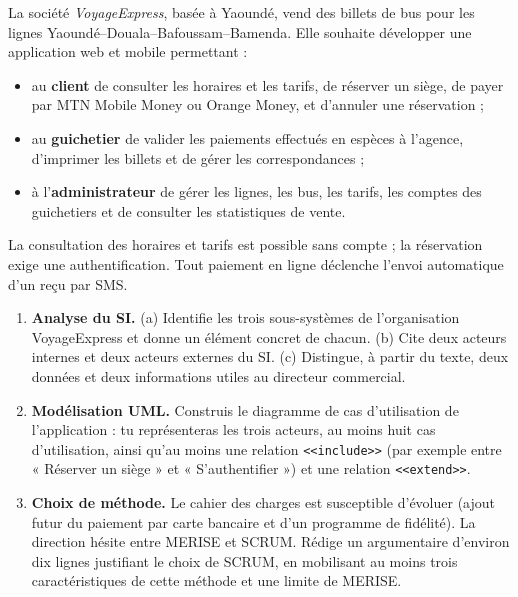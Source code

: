 \documentclass[11pt]{article}
\begin{document}
\begin{exercice}
La société \emph{VoyageExpress}, basée à Yaoundé, vend des billets de bus pour les lignes Yaoundé--Douala--Bafoussam--Bamenda. Elle souhaite développer une application web et mobile permettant :
\begin{itemize}
    \item au \textbf{client} de consulter les horaires et les tarifs, de réserver un siège, de payer par MTN Mobile Money ou Orange Money, et d'annuler une réservation ;
    \item au \textbf{guichetier} de valider les paiements effectués en espèces à l'agence, d'imprimer les billets et de gérer les correspondances ;
    \item à l'\textbf{administrateur} de gérer les lignes, les bus, les tarifs, les comptes des guichetiers et de consulter les statistiques de vente.
\end{itemize}
La consultation des horaires et tarifs est possible sans compte ; la réservation exige une authentification. Tout paiement en ligne déclenche l'envoi automatique d'un reçu par SMS.

\begin{enumerate}
    \item \textbf{Analyse du SI.} (a) Identifie les trois sous-systèmes de l'organisation VoyageExpress et donne un élément concret de chacun. (b) Cite deux acteurs internes et deux acteurs externes du SI. (c) Distingue, à partir du texte, deux données et deux informations utiles au directeur commercial.
    \item \textbf{Modélisation UML.} Construis le diagramme de cas d'utilisation de l'application : tu représenteras les trois acteurs, au moins huit cas d'utilisation, ainsi qu'au moins une relation \texttt{<<include>>} (par exemple entre « Réserver un siège » et « S'authentifier ») et une relation \texttt{<<extend>>}.
    \item \textbf{Choix de méthode.} Le cahier des charges est susceptible d'évoluer (ajout futur du paiement par carte bancaire et d'un programme de fidélité). La direction hésite entre MERISE et SCRUM. Rédige un argumentaire d'environ dix lignes justifiant le choix de SCRUM, en mobilisant au moins trois caractéristiques de cette méthode et une limite de MERISE.
\end{enumerate}
\end{exercice}
\end{document}

